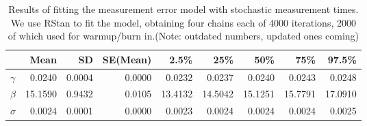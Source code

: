 \documentclass{article}
\begin{document}
\begin{table}[ht]
  \centering
  \begin{tabular}{lrrrrrrrr}
    \hline
            & Mean    & SD     & SE(Mean) & 2.5\%   & 25\%    & 50\%    & 75\%    & 97.5\% \\ 
    \hline
   $\gamma$ & 0.0240  & 0.0004 & 0.0000   & 0.0232  & 0.0237  & 0.0240  & 0.0243  & 0.0248 \\ 
   $\beta$  & 15.1590 & 0.9432 & 0.0105   & 13.4132 & 14.5042 & 15.1251 & 15.7791 & 17.0910 \\ 
   $\sigma$ & 0.0024  & 0.0001 & 0.0000   & 0.0023  & 0.0024  & 0.0024  & 0.0024  & 0.0025 \\ 
    \hline
 \end{tabular}
 \caption{Results of fitting the measurement error model with stochastic measurement times. We use RStan to fit the model, obtaining four chains each of 4000 iterations, 2000 of which used for warmup/burn in.\protect\footnotemark (Note: outdated numbers, updated ones coming) }
 \label{tab:modelfit}
 \end{table}


\end{document}
